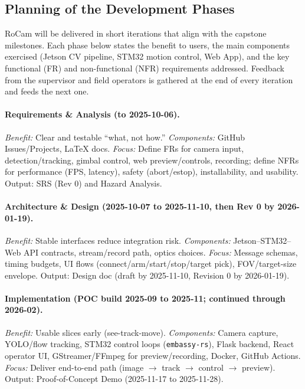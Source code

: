 \documentclass[12pt]{article}
\begin{document}
\subsection{Planning of the Development Phases}

RoCam will be delivered in short iterations that align with the capstone milestones. Each phase below states the benefit to users, the main components exercised (Jetson CV pipeline, STM32 motion control, Web App), and the key functional (FR) and non-functional (NFR) requirements addressed. Feedback from the supervisor and field operators is gathered at the end of every iteration and feeds the next one.

\paragraph{Requirements \& Analysis (to 2025-10-06).}
\emph{Benefit:} Clear and testable “what, not how.”  
\emph{Components:} GitHub Issues/Projects, LaTeX docs.  
\emph{Focus:} Define FRs for camera input, detection/tracking, gimbal control, web preview/controls, recording; define NFRs for performance (FPS, latency), safety (abort/estop), installability, and usability. Output: SRS (Rev 0) and Hazard Analysis.

\paragraph{Architecture \& Design (2025-10-07 to 2025-11-10, then Rev 0 by 2026-01-19).}
\emph{Benefit:} Stable interfaces reduce integration risk.  
\emph{Components:} Jetson–STM32–Web API contracts, stream/record path, optics choices.  
\emph{Focus:} Message schemas, timing budgets, UI flows (connect/arm/start/stop/target pick), FOV/target-size envelope. Output: Design doc (draft by 2025-11-10, Revision 0 by 2026-01-19).

\paragraph{Implementation (POC build 2025-09 to 2025-11; continued through 2026-02).}
\emph{Benefit:} Usable slices early (see-track-move).  
\emph{Components:} Camera capture, YOLO/flow tracking, STM32 control loops (\texttt{embassy-rs}), Flask backend, React operator UI, GStreamer/FFmpeg for preview/recording, Docker, GitHub Actions.  
\emph{Focus:} Deliver end-to-end path (image $\rightarrow$ track $\rightarrow$ control $\rightarrow$ preview). Output: Proof-of-Concept Demo (2025-11-17 to 2025-11-28).
\end{document}
